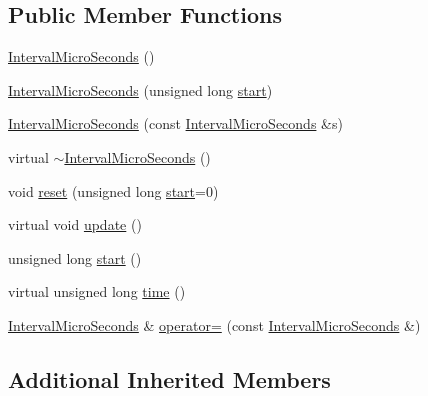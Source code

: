 \subsection*{Public Member Functions}
\begin{DoxyCompactItemize}
\item 
\hyperlink{classsmrtobj_1_1timer_1_1_interval_micro_seconds_a9dd6ff45eba9d3d2e972816086de056c}{Interval\+Micro\+Seconds} ()
\item 
\hyperlink{classsmrtobj_1_1timer_1_1_interval_micro_seconds_acb3760ee7ae1c2db2fd1a384aa444402}{Interval\+Micro\+Seconds} (unsigned long \hyperlink{classsmrtobj_1_1timer_1_1_interval_micro_seconds_afce0cbc55f0c884f0edb600ee3079ee9}{start})
\item 
\hyperlink{classsmrtobj_1_1timer_1_1_interval_micro_seconds_a1faf60520d61f2fb4ee551d79f9a52f4}{Interval\+Micro\+Seconds} (const \hyperlink{classsmrtobj_1_1timer_1_1_interval_micro_seconds}{Interval\+Micro\+Seconds} \&s)
\item 
virtual \hyperlink{classsmrtobj_1_1timer_1_1_interval_micro_seconds_a73131f274a84cf3fa7304c077dbc4314}{$\sim$\+Interval\+Micro\+Seconds} ()
\item 
void \hyperlink{classsmrtobj_1_1timer_1_1_interval_micro_seconds_a3e88ed37bc5cb4cbee0a745b040aaac5}{reset} (unsigned long \hyperlink{classsmrtobj_1_1timer_1_1_interval_micro_seconds_afce0cbc55f0c884f0edb600ee3079ee9}{start}=0)
\item 
virtual void \hyperlink{classsmrtobj_1_1timer_1_1_interval_micro_seconds_aa2679f2385f9e2182749ab696fa18ee6}{update} ()
\item 
unsigned long \hyperlink{classsmrtobj_1_1timer_1_1_interval_micro_seconds_afce0cbc55f0c884f0edb600ee3079ee9}{start} ()
\item 
virtual unsigned long \hyperlink{classsmrtobj_1_1timer_1_1_interval_micro_seconds_a583105ce23f3ffdefe31cbdccbb037c7}{time} ()
\item 
\hyperlink{classsmrtobj_1_1timer_1_1_interval_micro_seconds}{Interval\+Micro\+Seconds} \& \hyperlink{classsmrtobj_1_1timer_1_1_interval_micro_seconds_a4cd5de15337b6af42929f2c8c80d9b37}{operator=} (const \hyperlink{classsmrtobj_1_1timer_1_1_interval_micro_seconds}{Interval\+Micro\+Seconds} \&)
\end{DoxyCompactItemize}
\subsection*{Additional Inherited Members}


